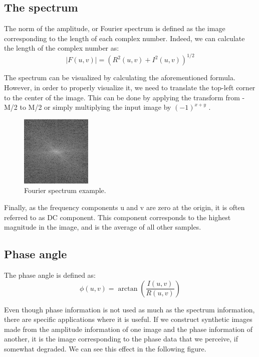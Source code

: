 \documentclass[12pt]{article}
\begin{document}
\subsection{The spectrum}
The norm of the amplitude, or Fourier spectrum is defined as the image corresponding to the length of each complex number. Indeed, we can calculate the length of the complex number as:
\begin{equation}
	|F(u,v)|= (R^2(u,v) + I^2(u,v))^{1/2}
\end{equation}

The spectrum can be visualized by calculating the aforementioned formula. However, in order to properly visualize it, we need to translate the top-left corner to the center of the image. This can be done by applying the transform from -M/2 to M/2 or simply multiplying the input image by $(-1)^{x+y}$ \cite{Gonzalez2008}.

\begin{figure}[!htbp]
	\begin{center}
		\leavevmode
		\includegraphics[scale=1]{images/spectrum.png}
		\caption{Fourier spectrum example.}
	\end{center}
\end{figure}

Finally, as the frequency components u and v are zero at the origin, it is often referred to as DC component. This component corresponds to the highest magnitude in the image, and is the average of all other samples.

\subsection{Phase angle}
The phase angle is defined as:
\begin{equation}
	\phi(u,v) = \arctan(\frac{I(u,v)}{R(u,v)})
\end{equation}

Even though phase information is not used as much as the spectrum information, there are specific applications where it is useful. If we construct synthetic images made from the amplitude information of one image and the phase information of another, it is the image corresponding to the phase data that we perceive, if somewhat degraded. We can see this effect in the following figure.
\end{document}
